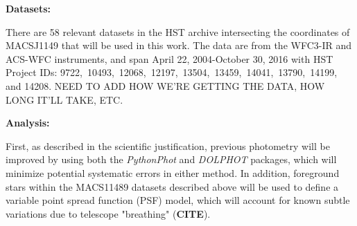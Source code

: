 \textbf{Datasets:}

There are 58 relevant datasets in the HST archive intersecting the coordinates of MACSJ1149 that 
will be used in this work. The data are from the WFC3-IR and ACS-WFC instruments, and span 
April 22, 2004-October 30, 2016 with HST Project IDs: 9722,\ 10493,\ 12068,\ 12197,\ 13504,\
13459,\ 14041,\  13790,\ 14199, and 14208. NEED TO ADD HOW WE'RE GETTING THE DATA,
HOW LONG IT'LL TAKE, ETC.

\bigskip

\noindent\textbf{Analysis:}

First, as described in the scientific justification, previous photometry will be improved by using both
the \textit{PythonPhot} and \textit{DOLPHOT} packages, which will minimize potential systematic errors
in either method. In addition, foreground stars within the MACS11489 datasets described above
will be used to define a variable point spread function (PSF) model, which will account for known 
subtle variations due to telescope "breathing" (\textbf{CITE}).

